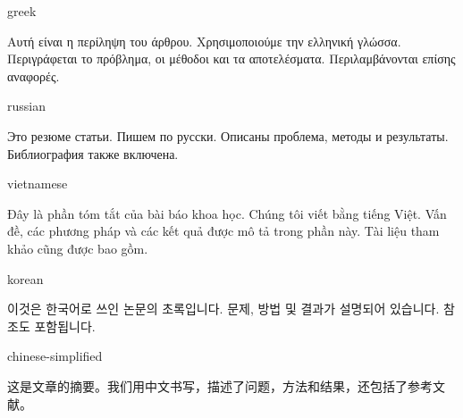 \documentclass[grid,balance,upint,subscriptcorrection,varvw,mathalfa=cal=euler,spanish,french,greek,russian,vietnamese,colorlinks]{asmeconf}
\begin{document}
\iffontspecloaded %
%
    \begin{selectlanguage}{greek}%
    \begin{abstract*}
    Αυτή είναι η περίληψη του άρθρου. Χρησιμοποιούμε την ελληνική γλώσσα. Περιγράφεται το πρόβλημα, οι μέθοδοι και τα αποτελέσματα. Περιλαμβάνονται επίσης αναφορές.
    \end{abstract*}
    \end{selectlanguage}%
%    
    \begin{selectlanguage}{russian}
    \begin{abstract*}
    Это резюме статьи. Пишем по русски. Описаны проблема, методы и результаты. Библиография также включена.%
    \end{abstract*}
    \end{selectlanguage}%
%
    \begin{selectlanguage}{vietnamese}
    \begin{abstract*}
    Đây là phần tóm tắt của bài báo khoa học. Chúng tôi viết bằng tiếng Việt. Vấn đề, các phương pháp và các kết quả được mô tả trong phần này. Tài liệu tham khảo cũng được bao gồm.
    \end{abstract*}
    \end{selectlanguage}%
%
%
    \begin{selectlanguage}{korean}
    \begin{abstract*}
    이것은 한국어로 쓰인 논문의 초록입니다. 문제, 방법 및 결과가 설명되어 있습니다. 참조도 포함됩니다.
    \end{abstract*}
    \end{selectlanguage}%
%
    \begin{selectlanguage}{chinese-simplified}
    \begin{abstract*}
    这是文章的摘要。我们用中文书写，描述了问题，方法和结果，还包括了参考文献。
    \end{abstract*}
    \end{selectlanguage}%
%
\fi

\end{document}
